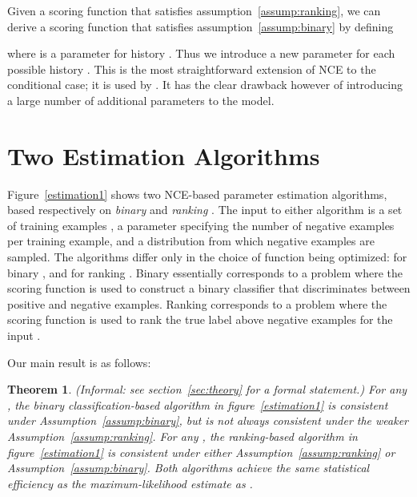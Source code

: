\documentclass[11pt,a4paper]{article}
\newtheorem{theorem}{Theorem}[section]
\newcommand{\commentout}[1]{}
\begin{document}
Given a scoring function  that satisfies
assumption~\ref{assump:ranking}, we can derive a scoring function
 that satisfies assumption~\ref{assump:binary} by defining

where  is a parameter for history . Thus we
introduce a new parameter  for each possible history . This is
the most straightforward extension of NCE to the conditional
case; it is used by \cite{mnih2012fast}. It has the clear
drawback however of introducing a large number of additional
parameters to the model.


\section{Two Estimation Algorithms}

\commentout{
This section first introduces the two negative sampling algorithms.
Section~\ref{sec:overview} then give an informal overview of consistency results for the two
algorithms (section~\ref{??} of this paper gives the full proof: we
include the informal discussion to give more intuition). Finally 
section~\ref{related}
discusses the use of the two algorithms in previous work.}

Figure~\ref{estimation1} shows two NCE-based parameter estimation
algorithms, based respectively on {\em binary } and {\em ranking
  }. The input to either algorithm is a set of training
examples , a parameter  specifying
the number of negative examples per training example, and a
distribution  from which negative examples are
sampled. The algorithms differ only in the choice of  function
being optimized:  for binary , and  for ranking
. Binary  essentially corresponds to a problem where the
scoring function  is used to construct a binary
classifier that discriminates between
positive and negative examples. Ranking  corresponds to a problem
where the scoring function  is used to rank the
true label  above negative examples 
for the input . 

Our main result is as follows:



\begin{theorem}(Informal: see section~\ref{sec:theory} for a formal statement.)
For any , the binary classification-based algorithm in
figure~\ref{estimation1} is consistent under
Assumption~\ref{assump:binary}, but is not always consistent under the
weaker Assumption~\ref{assump:ranking}. For any , the
ranking-based algorithm in figure~\ref{estimation1} is consistent under
either Assumption~\ref{assump:ranking} or
Assumption~\ref{assump:binary}. Both algorithms achieve the same
statistical efficiency as the maximum-likelihood estimate as .
\end{theorem}
\end{document}
